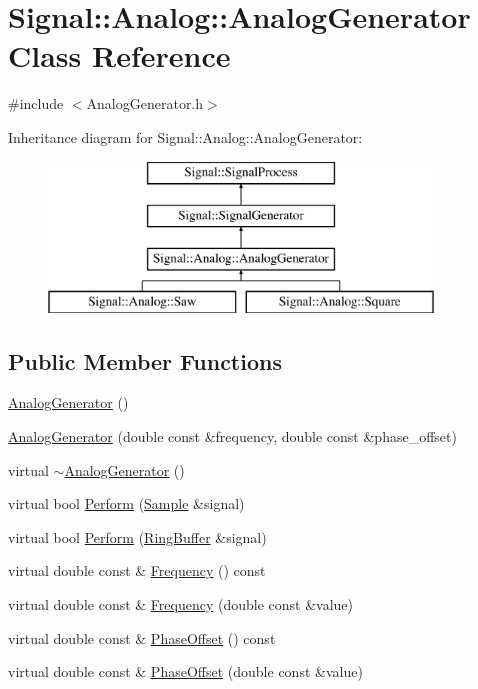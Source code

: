 \hypertarget{classSignal_1_1Analog_1_1AnalogGenerator}{\section{Signal\+:\+:Analog\+:\+:Analog\+Generator Class Reference}
\label{classSignal_1_1Analog_1_1AnalogGenerator}
}


{\ttfamily \#include $<$Analog\+Generator.\+h$>$}

Inheritance diagram for Signal\+:\+:Analog\+:\+:Analog\+Generator\+:\begin{figure}[H]
\begin{center}
\leavevmode
\includegraphics[height=4.000000cm]{classSignal_1_1Analog_1_1AnalogGenerator}
\end{center}
\end{figure}
\subsection*{Public Member Functions}
\begin{DoxyCompactItemize}
\item 
\hyperlink{classSignal_1_1Analog_1_1AnalogGenerator_ab5cf1522c33fa21b004ddf9cb4c66ba8}{Analog\+Generator} ()
\item 
\hyperlink{classSignal_1_1Analog_1_1AnalogGenerator_a8b4acd56abb3799a923dc5b1dbb16c1c}{Analog\+Generator} (double const \&frequency, double const \&phase\+\_\+offset)
\item 
virtual \hyperlink{classSignal_1_1Analog_1_1AnalogGenerator_aabc5dc2109a90d1d97a0c400a3028d79}{$\sim$\+Analog\+Generator} ()
\item 
virtual bool \hyperlink{classSignal_1_1Analog_1_1AnalogGenerator_a435d695634a52cff8249dde68be18e8a}{Perform} (\hyperlink{classSignal_1_1Sample}{Sample} \&signal)
\item 
virtual bool \hyperlink{classSignal_1_1Analog_1_1AnalogGenerator_a8aa38b6c3f259b62b293f235cf1cc906}{Perform} (\hyperlink{classSignal_1_1RingBuffer}{Ring\+Buffer} \&signal)
\item 
virtual double const \& \hyperlink{classSignal_1_1SignalGenerator_a96af42ee68f94e9b04d034fd68b73ecd}{Frequency} () const 
\item 
virtual double const \& \hyperlink{classSignal_1_1SignalGenerator_af83b532bf3ddc3637c2fd7a1dfd095cb}{Frequency} (double const \&value)
\item 
virtual double const \& \hyperlink{classSignal_1_1SignalGenerator_ac2538ec946f001e394d2416fda698d1c}{Phase\+Offset} () const 
\item 
virtual double const \& \hyperlink{classSignal_1_1SignalGenerator_ac6a103ff72beaa338f6d18c812522d78}{Phase\+Offset} (double const \&value)
\end{DoxyCompactItemize}
